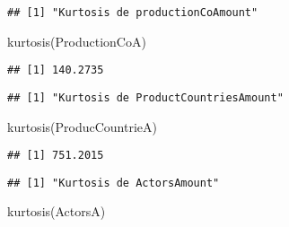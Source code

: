 \documentclass[
]{article}
\newenvironment{Shaded}{\begin{snugshade}}{\end{snugshade}}
\newcommand{\CommentTok}[1]{\textcolor[rgb]{0.56,0.35,0.01}{\textit{#1}}}
\newcommand{\FunctionTok}[1]{\textcolor[rgb]{0.00,0.00,0.00}{#1}}
\newcommand{\NormalTok}[1]{#1}
\newcommand{\OtherTok}[1]{\textcolor[rgb]{0.56,0.35,0.01}{#1}}
\newcommand{\SpecialCharTok}[1]{\textcolor[rgb]{0.00,0.00,0.00}{#1}}
\newcommand{\StringTok}[1]{\textcolor[rgb]{0.31,0.60,0.02}{#1}}
\begin{document}
\begin{verbatim}
## [1] "Kurtosis de productionCoAmount"
\end{verbatim}

\begin{Shaded}
\begin{Highlighting}[]
\FunctionTok{kurtosis}\NormalTok{(ProductionCoA)}
\end{Highlighting}
\end{Shaded}

\begin{verbatim}
## [1] 140.2735
\end{verbatim}

\begin{Shaded}
\end{Shaded}

\begin{verbatim}
## [1] "Kurtosis de ProductCountriesAmount"
\end{verbatim}

\begin{Shaded}
\begin{Highlighting}[]
\FunctionTok{kurtosis}\NormalTok{(ProducCountrieA)}
\end{Highlighting}
\end{Shaded}

\begin{verbatim}
## [1] 751.2015
\end{verbatim}

\begin{Shaded}
\end{Shaded}

\begin{verbatim}
## [1] "Kurtosis de ActorsAmount"
\end{verbatim}

\begin{Shaded}
\begin{Highlighting}[]
\FunctionTok{kurtosis}\NormalTok{(ActorsA)}
\end{Highlighting}
\end{Shaded}
\end{document}
